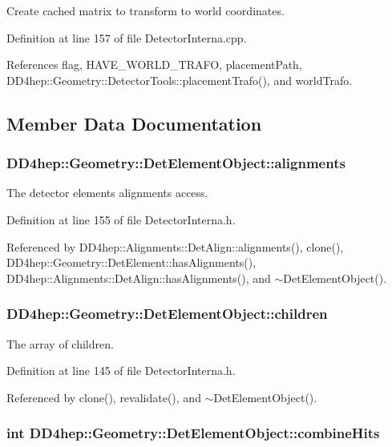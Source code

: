 Create cached matrix to transform to world coordinates. 

Definition at line 157 of file DetectorInterna.cpp.

References flag, HAVE\_\-WORLD\_\-TRAFO, placementPath, DD4hep::Geometry::DetectorTools::placementTrafo(), and worldTrafo.

\subsection{Member Data Documentation}
\hypertarget{class_d_d4hep_1_1_geometry_1_1_det_element_object_a400be16718ec486e44ad340f86946fcd}{
\subsubsection[{alignments}]{ {\bf DD4hep::Geometry::DetElementObject::alignments}}}
\label{class_d_d4hep_1_1_geometry_1_1_det_element_object_a400be16718ec486e44ad340f86946fcd}


The detector elements alignments access. 

Definition at line 155 of file DetectorInterna.h.

Referenced by DD4hep::Alignments::DetAlign::alignments(), clone(), DD4hep::Geometry::DetElement::hasAlignments(), DD4hep::Alignments::DetAlign::hasAlignments(), and $\sim$DetElementObject().\hypertarget{class_d_d4hep_1_1_geometry_1_1_det_element_object_add8a182c8a2e611f0241bb752dfe9046}{
\subsubsection[{children}]{ {\bf DD4hep::Geometry::DetElementObject::children}}}
\label{class_d_d4hep_1_1_geometry_1_1_det_element_object_add8a182c8a2e611f0241bb752dfe9046}


The array of children. 

Definition at line 145 of file DetectorInterna.h.

Referenced by clone(), revalidate(), and $\sim$DetElementObject().\hypertarget{class_d_d4hep_1_1_geometry_1_1_det_element_object_a36e650a06cc4b82337bc3354bd38402a}{
\subsubsection[{combineHits}]{\setlength{\rightskip}{0pt plus 5cm}int {\bf DD4hep::Geometry::DetElementObject::combineHits}}}
\label{class_d_d4hep_1_1_geometry_1_1_det_element_object_a36e650a06cc4b82337bc3354bd38402a}


